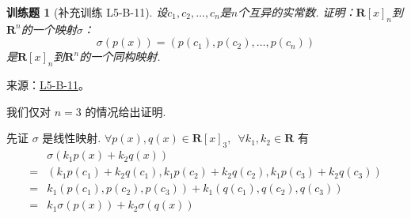 \documentclass[UTF8,12pt,a4paper,fontset=fandol]{ctexart}
\newtheorem{exercise}{训练题}[section]
\begin{document}
\begin{exercise}[补充训练 L5-B-11]\label{prob:L5-B-11}
设$c_1,c_2,\ldots,c_n$是$n$个互异的实常数. 证明：$\mathbf{R}[x]_n$到$\mathbf{R}^n$的一个映射$\sigma$：
        \[\sigma(p(x))=(p(c_1),p(c_2),\ldots,p(c_n))\]
        是$\mathbf{R}[x]_n$到$\mathbf{R}^n$的一个同构映射.
\end{exercise}
\noindent 来源：\href{https://github.com/yhwu-is/Linear-Algebra-Left-Undone/blob/new/%E8%AE%B2%E4%B9%89/%E4%B8%93%E9%A2%98/5%20%E7%BA%BF%E6%80%A7%E6%98%A0%E5%B0%84.tex}{L5-B-11}。
\begin{solve}
我们仅对 $ n = 3 $ 的情况给出证明. 

          先证 $ \sigma $ 是线性映射. $ \forall p(x), q(x) \in \mathbf{R}[x]_3,\enspace \forall k_1, k_2 \in \mathbf{R} $ 有
          \begin{align*}
                  & \sigma(k_1 p(x) + k_2 q(x))                                                 \\
              ={} & (k_1 p(c_1) + k_2 q(c_1), k_1 p(c_2) + k_2 q(c_2), k_1 p(c_3) + k_2 q(c_3)) \\
              ={} & k_1(p(c_1), p(c_2), p(c_3)) + k_1(q(c_1), q(c_2), q(c_3))                   \\
              ={} & k_1 \sigma(p(x)) + k_2 \sigma(q(x))
          \end{align*}


\end{solve}
\end{document}
